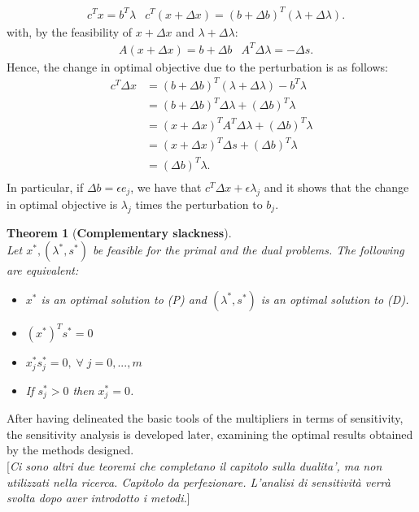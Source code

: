 \documentclass[a4paper,10 pt,titlepage,twoside]{book}
\theoremstyle{plain}
\newtheorem{thm}{Theorem}[chapter]
\theoremstyle{definition}
\theoremstyle{remark}
\begin{document}
\begin{align*}
&c^{T}x=b^{T}\lambda  &c^{T}(x + \Delta x)=\left(b+\Delta b\right)^{T}\left(\lambda+\Delta \lambda\right).
\end{align*}
with, by the feasibility of $x + \Delta x$ and $\lambda+\Delta \lambda$:
\begin{align*}
&A(x + \Delta x)=b+\Delta b
&A^{T}\Delta\lambda=-\Delta s.
\end{align*}
Hence, the change in optimal objective due to the perturbation is as follows:
\begin{align*}
c^{T}\Delta x&=\left(b+\Delta b\right)^{T}\left(\lambda+\Delta \lambda\right) - b^{T}\lambda\\
&=\left(b+\Delta b\right)^{T}\Delta \lambda+\left(\Delta b\right)^{T}\lambda\\
&=\left(x+\Delta x\right)^{T}A^{T}\Delta \lambda+\left(\Delta b\right)^{T}\lambda\\
&=\left(x+\Delta x\right)^{T}\Delta s+\left(\Delta b\right)^{T}\lambda\\
&=\left(\Delta b\right)^{T}\lambda.\\
\end{align*} 
In particular, if $\Delta b = \epsilon e_{j}$, we have that $c^{T}\Delta x+\epsilon \lambda_{j}$ and it shows that the change in optimal objective is $\lambda_{j}$ times the perturbation to $b_{j}$.
\begin{thm}[\textbf{Complementary slackness}] \ \\
	Let $x^{*},(\lambda^{*},s^{*})$ be feasible for the primal and the dual problems. The following are equivalent:
	\begin{itemize}
		\item $x^{*}$ is an optimal solution to (P) and $(\lambda^{*},s^{*})$ is an optimal solution to (D).
		\item $(x^{*})^{T}s^{*}=0$
		\item $x^{*}_{j}s^{*}_{j}=0,\;\forall\; j=0,...,m$
		\item If $s^{*}_{j} > 0$ then $x^{*}_{j}= 0$.
	\end{itemize}
\end{thm}

After having delineated the basic tools of the multipliers in terms of sensitivity, the sensitivity analysis is developed later, examining the optimal results obtained by the methods designed.\\

[\textit{Ci sono altri due teoremi che completano il capitolo sulla dualita', ma non utilizzati nella ricerca. Capitolo da perfezionare. L'analisi di sensitività verrà svolta dopo aver introdotto i metodi.}]
%
%
\end{document}
